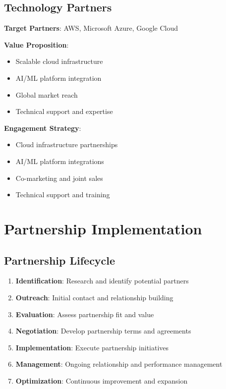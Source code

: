 \documentclass[business]{../templates/infraradar-main}
\begin{document}
\subsection{Technology Partners}
\textbf{Target Partners}: AWS, Microsoft Azure, Google Cloud

\textbf{Value Proposition}:
\begin{itemize}
    \item Scalable cloud infrastructure
    \item AI/ML platform integration
    \item Global market reach
    \item Technical support and expertise
\end{itemize}

\textbf{Engagement Strategy}:
\begin{itemize}
    \item Cloud infrastructure partnerships
    \item AI/ML platform integrations
    \item Co-marketing and joint sales
    \item Technical support and training
\end{itemize}

\section{Partnership Implementation}

\subsection{Partnership Lifecycle}
\begin{enumerate}
    \item \textbf{Identification}: Research and identify potential partners
    \item \textbf{Outreach}: Initial contact and relationship building
    \item \textbf{Evaluation}: Assess partnership fit and value
    \item \textbf{Negotiation}: Develop partnership terms and agreements
    \item \textbf{Implementation}: Execute partnership initiatives
    \item \textbf{Management}: Ongoing relationship and performance management
    \item \textbf{Optimization}: Continuous improvement and expansion
\end{enumerate}
\end{document}
